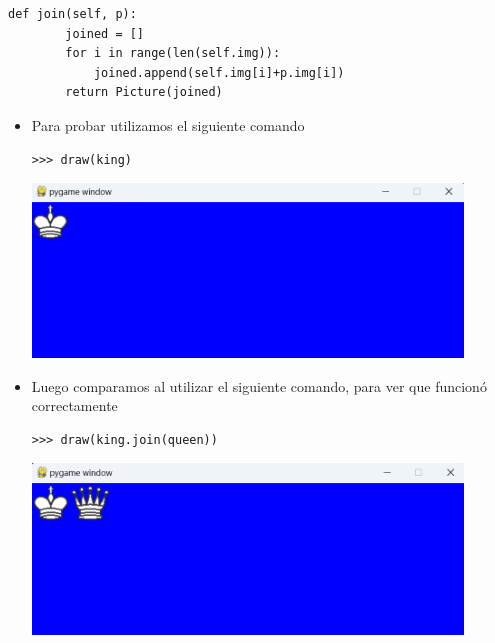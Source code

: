 \documentclass{article}
\begin{document}
\begin{itemize}
    \begin{lstlisting}[style=python]
    def join(self, p):
        joined = []
        for i in range(len(self.img)):
            joined.append(self.img[i]+p.img[i])
        return Picture(joined)
    \end{lstlisting}

    \vspace{\baselineskip}

    \begin{itemize}
      \item Para probar utilizamos el siguiente comando

      \begin{lstlisting}[style=shell]
      >>> draw(king)
      \end{lstlisting}
      \begin{minipage}{\linewidth}
        \centering
        \includegraphics[width=0.9\textwidth]{imagenes/p_join1.png}
      \end{minipage}

      \vspace{2\baselineskip}

      \item Luego comparamos al utilizar el siguiente comando, para ver que funcionó correctamente
      \begin{lstlisting}[style=shell]
      >>> draw(king.join(queen))
      \end{lstlisting}
      \begin{minipage}{\linewidth}
        \centering
        \includegraphics[width=0.9\textwidth]{imagenes/p_join2.png}
      \end{minipage}
    \end{itemize}


\end{itemize}
\end{document}

